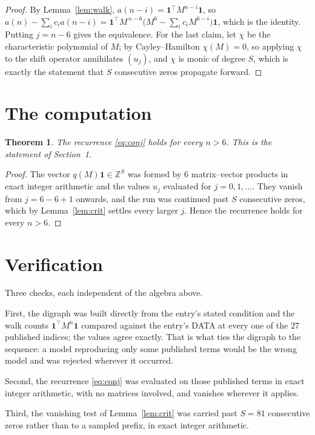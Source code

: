 \documentclass[11pt,a4paper]{article}
\theoremstyle{plain}
\newtheorem{theorem}{Theorem}
\theoremstyle{definition}
\begin{document}
\begin{proof}
By Lemma~\ref{lem:walk}, $a(n-i)=\mathbf{1}^{\!\top}M^{n-i}\mathbf{1}$, so
$a(n)-\sum_i c_i a(n-i)
=\mathbf{1}^{\!\top}M^{\,n-6}\bigl(M^{6}-\sum_i c_i M^{6-i}\bigr)
\mathbf{1}$, which is the identity. Putting $j=n-6$ gives the equivalence. For the
last claim, let $\chi$ be the characteristic polynomial of $M$; by Cayley--Hamilton
$\chi(M)=0$, so applying $\chi$ to the shift operator annihilates $(u_j)$, and $\chi$ is
monic of degree $S$, which is exactly the statement that $S$ consecutive zeros propagate
forward.
\end{proof}

\section{The computation}

\begin{theorem}
The recurrence \eqref{eq:conj} holds for every $n>6$. This is the statement of
Section~1.
\end{theorem}

\begin{proof}
The vector $q(M)\mathbf{1}\in\mathbb{Z}^{S}$ was formed by $6$ matrix--vector
products in exact integer arithmetic and the values $u_j$ evaluated for
$j=0,1,\dots$. They vanish from $j=6-6+1$ onwards, and the run was continued past
$S$ consecutive zeros, which by Lemma~\ref{lem:crit} settles every larger $j$. Hence the
recurrence holds for every $n>6$.
\end{proof}

\section{Verification}

Three checks, each independent of the algebra above.

First, the digraph was built directly from the entry's stated condition and the walk counts
$\mathbf{1}^{\!\top}M^{n}\mathbf{1}$ compared against the entry's DATA at every one of
the $27$ published indices; the values agree exactly. That is what ties the digraph to
the sequence: a model reproducing only some published terms would be the wrong model and
was rejected wherever it occurred.

Second, the recurrence \eqref{eq:conj} was evaluated on those published terms in exact
integer arithmetic, with no matrices involved, and vanishes wherever it applies.

Third, the vanishing test of Lemma~\ref{lem:crit} was carried past $S=81$ consecutive
zeros rather than to a sampled prefix, in exact integer arithmetic.
\end{document}
